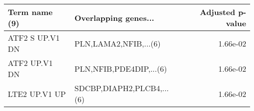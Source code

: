 \begin{tabular}{llr}
\toprule
  Term name (9) &      Overlapping genes... &  Adjusted p-value \\
\midrule
ATF2 S UP.V1 DN &     PLN,LAMA2,NFIB,...(6) &          1.66e-02 \\
  ATF2 UP.V1 DN &   PLN,NFIB,PDE4DIP,...(6) &          1.66e-02 \\
  LTE2 UP.V1 UP & SDCBP,DIAPH2,PLCB4,...(6) &          1.66e-02 \\
\bottomrule
\end{tabular}
